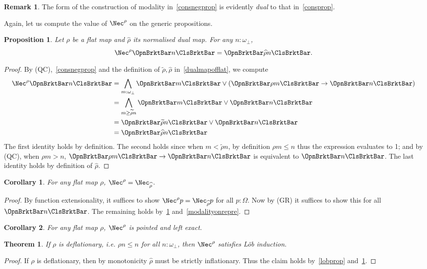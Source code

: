 \documentclass[a4paper,10pt]{amsart}
\newtheorem{theorem}{Theorem}[section]
\newtheorem{corollary}{Corollary}[section]
\newtheorem{proposition}{Proposition}[section]
\theoremstyle{definition}
\newtheorem{remark}{Remark}[section]
\newcommand{\pf}[1]{\widehat{#1}}
\newcommand{\qsi}[1]{\widetilde{#1}}
\newcommand{\ass}[1]{\OpnBrktBar#1\ClsBrktBar}
\newcommand{\ovob}{\omega_\bot}
\newcommand{\bbx}{\Nec}
\newcommand{\Prop}{\Omega}
\begin{document}
\begin{remark}
  The form of the construction of modality in~\cref{consnegprop} is evidently \emph{dual} to that in~\cref{consprop}.
\end{remark}

Again, let us compute the value of $\bbx^\rho$ on the generic propositions.

\begin{proposition}\label{neglateronrep}
  Let $\rho$ be a flat map and $\pf\rho$ its normalised dual map. For any $n:\ovob$,
  \[ \bbx^\rho\ass n = \ass{\pf\rho n}. \]
\end{proposition}
\begin{proof}
  By (QC),~\cref{consnegprop} and the definition of $\qsi\rho,\pf\rho$ in~\cref{dualmapofflat}, we compute
  \begin{align*}
    \bbx^\rho\ass n 
    &= \bigwedge_{m:\ovob} \ass m \vee (\ass{\rho m} \to \ass n) \\ 
    &= \bigwedge_{m \ge \qsi\rho n} \ass m \vee \ass n \\
    &= \ass{\qsi\rho n} \vee \ass n  \\
    &= \ass{\pf\rho n} \qedhere
  \end{align*}
  The first identity holds by definition. The second holds since when $m < \qsi\rho n$, by definition $\rho m \le n$ thus the expression evaluates to 1; and by (QC), when $\rho m > n$, $\ass{\rho m} \to \ass n$ is equivalent to $\ass n$. The last identity holds by definition of $\pf\rho$.
\end{proof}

\begin{corollary}\label{negispos}
  For any flat map $\rho$, $\bbx^\rho = \bbx_{\pf\rho}$.
\end{corollary}
\begin{proof}
  By function extensionality, it suffices to show $\bbx^\rho p = \bbx_{\pf\rho}p$ for all $p:\Prop$. Now by (GR) it suffices to show this for all $\ass n$. The remaining holds by~\cref{neglateronrep} and~\cref{modalityonrepre}.
\end{proof}

\begin{corollary}
  For any flat map $\rho$, $\bbx^\rho$ is pointed and left exact.
\end{corollary}

\begin{theorem}\label{canonicallob}
  If $\rho$ is deflationary, i.e. $\rho n \le n$ for all $n:\ovob$, then $\bbx^\rho$ satisfies L\"ob induction.
\end{theorem}
\begin{proof}
  If $\rho$ is deflationary, then by monotonicity $\pf\rho$ must be strictly inflationary. Thus the claim holds by~\cref{lobprop} and~\cref{negispos}.
\end{proof}
\end{document}
